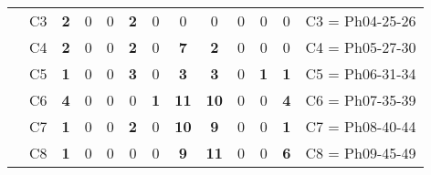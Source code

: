 \begin{table}[H]
{\begin{tabular}{|ccccccccccccc|}
\multicolumn{1}{|c|}{}                                      & \multicolumn{1}{c|}{C3} & \multicolumn{1}{c|}{\textbf{2}}  & \multicolumn{1}{c|}{0}  & \multicolumn{1}{c|}{0}  & \multicolumn{1}{c|}{\textbf{2}}  & \multicolumn{1}{c|}{0}  & \multicolumn{1}{c|}{0}  & \multicolumn{1}{c|}{0}  & \multicolumn{1}{c|}{0}  & \multicolumn{1}{c|}{0}  & \multicolumn{1}{c|}{0}  & C3 = Ph04-25-26   \\ \cline{2-13}
\multicolumn{1}{|c|}{}                                      & \multicolumn{1}{c|}{C4} & \multicolumn{1}{c|}{\textbf{2}}  & \multicolumn{1}{c|}{0}  & \multicolumn{1}{c|}{0}  & \multicolumn{1}{c|}{\textbf{2}}  & \multicolumn{1}{c|}{0}  & \multicolumn{1}{c|}{\textbf{7}}  & \multicolumn{1}{c|}{\textbf{2}}  & \multicolumn{1}{c|}{0}  & \multicolumn{1}{c|}{0}  & \multicolumn{1}{c|}{0}  & C4 = Ph05-27-30   \\ \cline{2-13}
\multicolumn{1}{|c|}{}                                      & \multicolumn{1}{c|}{C5} & \multicolumn{1}{c|}{\textbf{1}}  & \multicolumn{1}{c|}{0}  & \multicolumn{1}{c|}{0}  & \multicolumn{1}{c|}{\textbf{3}}  & \multicolumn{1}{c|}{0}  & \multicolumn{1}{c|}{\textbf{3}}  & \multicolumn{1}{c|}{\textbf{3}}  & \multicolumn{1}{c|}{0}  & \multicolumn{1}{c|}{\textbf{1}}  & \multicolumn{1}{c|}{\textbf{1}}  & C5 = Ph06-31-34   \\ \cline{2-13}
\multicolumn{1}{|c|}{}                                      & \multicolumn{1}{c|}{C6} & \multicolumn{1}{c|}{\textbf{4}}  & \multicolumn{1}{c|}{0}  & \multicolumn{1}{c|}{0}  & \multicolumn{1}{c|}{0}  & \multicolumn{1}{c|}{\textbf{1}}  & \multicolumn{1}{c|}{\textbf{11}} & \multicolumn{1}{c|}{\textbf{10}} & \multicolumn{1}{c|}{0}  & \multicolumn{1}{c|}{0}  & \multicolumn{1}{c|}{\textbf{4}}  & C6 = Ph07-35-39   \\ \cline{2-13}
\multicolumn{1}{|c|}{}                                      & \multicolumn{1}{c|}{C7} & \multicolumn{1}{c|}{\textbf{1}}  & \multicolumn{1}{c|}{0}  & \multicolumn{1}{c|}{0}  & \multicolumn{1}{c|}{\textbf{2}}  & \multicolumn{1}{c|}{0}  & \multicolumn{1}{c|}{\textbf{10}} & \multicolumn{1}{c|}{\textbf{9}}  & \multicolumn{1}{c|}{0}  & \multicolumn{1}{c|}{0}  & \multicolumn{1}{c|}{\textbf{1}}  & C7 = Ph08-40-44   \\ \cline{2-13}
\multicolumn{1}{|c|}{}                                      & \multicolumn{1}{c|}{C8} & \multicolumn{1}{c|}{\textbf{1}}  & \multicolumn{1}{c|}{0}  & \multicolumn{1}{c|}{0}  & \multicolumn{1}{c|}{0}  & \multicolumn{1}{c|}{0}  & \multicolumn{1}{c|}{\textbf{9}}  & \multicolumn{1}{c|}{\textbf{11}} & \multicolumn{1}{c|}{0}  & \multicolumn{1}{c|}{0}  & \multicolumn{1}{c|}{\textbf{6}}  & C8 = Ph09-45-49   \\ \cline{2-13}

\end{tabular}}
\end{table}
